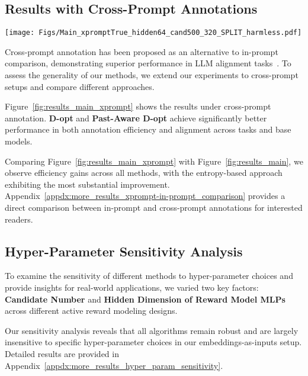 \subsection{Results with Cross-Prompt Annotations}

\begin{figure*}[ht!]
    \centering
    \texttt{[image: Figs/Main\_xpromptTrue\_hidden64\_cand500\_320\_SPLIT\_harmless.pdf]}\vspace{-0.2cm}
    \caption{\small Comparing annotation efficiency of different methods under the \textbf{Cross-Prompt} annotation setups. (\texttt{Harmless} Dataset, 3 Models, 8 Methods). First row: $1 -$ Spearman's Correlation (\textbf{lower is better}); second row: Best-of-N reward (\textbf{higher is better}). Experiments are repeated with 5 seeds.}\vspace{-0.3cm}
    \label{fig:results_main_xprompt}
\end{figure*}
Cross-prompt annotation has been proposed as an alternative to in-prompt comparison, demonstrating superior performance in LLM alignment tasks~\citep[][see also \cref{app:futherdisc}]{yin2024relative,sun2024rethinking}. To assess the generality of our methods, we extend our experiments to cross-prompt setups and compare different approaches.

Figure~\ref{fig:results_main_xprompt} shows the results under cross-prompt annotation. \textbf{D-opt} and \textbf{Past-Aware D-opt} achieve significantly better performance in both annotation efficiency and alignment across tasks and base models.

Comparing Figure~\ref{fig:results_main_xprompt} with Figure~\ref{fig:results_main}, we observe efficiency gains across all methods, with the entropy-based approach exhibiting the most substantial improvement. Appendix~\ref{appdx:more_results_xprompt-in-prompt_comparison} provides a direct comparison between in-prompt and cross-prompt annotations for interested readers.


\subsection{Hyper-Parameter Sensitivity Analysis}
To examine the sensitivity of different methods to hyper-parameter choices and provide insights for real-world applications, we varied two key factors: \textbf{Candidate Number} and \textbf{Hidden Dimension of Reward Model MLPs} across different active reward modeling designs.

Our sensitivity analysis reveals that all algorithms remain robust and are largely insensitive to specific hyper-parameter choices in our embeddings-as-inputs setup. Detailed results are provided in Appendix~\ref{appdx:more_results_hyper_param_sensitivity}.










